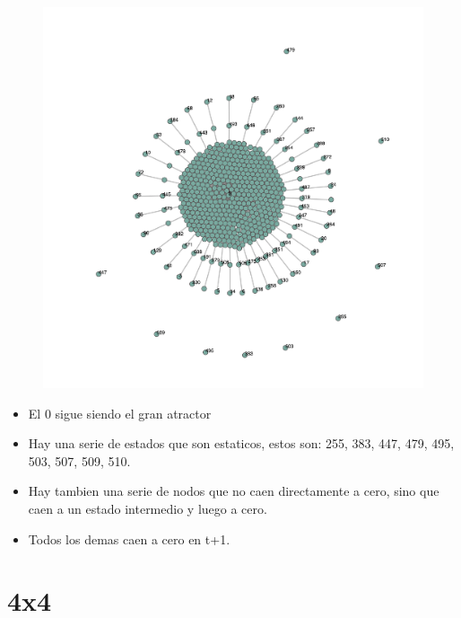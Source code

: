 \documentclass[12pt, fleqn]{report}                             %
\theoremstyle{break}                                            %
\begin{document}
        \begin{figure}[ht!]
          \centering
          \includegraphics[height=\textwidth]{dif3.png}
        \end{figure}

        \begin{itemize}
          \item El 0 sigue siendo el gran atractor
          \item Hay una serie de estados que son estaticos, estos son: 255, 383, 447, 479, 495, 503, 507, 509, 510.
          \item Hay tambien una serie de nodos que no caen directamente a cero, sino que caen a un estado intermedio
          y luego a cero.
          \item Todos los demas caen a cero en t+1.
        \end{itemize}

      \clearpage
      \section{4x4}
\end{document}
